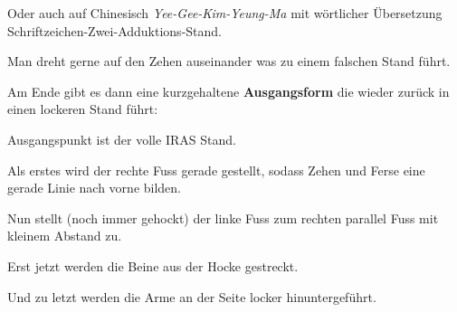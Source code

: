 	
	\begin{WTCommonBegriff}
		Oder auch auf Chinesisch \textit{Yee-Gee-Kim-Yeung-Ma} mit w\"ortlicher \"Ubersetzung Schriftzeichen-Zwei-Adduktions-Stand.
	\end{WTCommonBegriff}
	
\begin{WTCommonNoob}
	Man dreht gerne auf den Zehen auseinander was zu einem falschen Stand f\"uhrt.
\end{WTCommonNoob}




Am Ende gibt es dann eine kurzgehaltene \textbf{Ausgangsform} die wieder zur\"uck in einen lockeren Stand f\"uhrt:

\begin{WTalphenum}
	\item Ausgangspunkt ist der volle IRAS Stand.
	\item Als erstes wird der rechte Fuss gerade gestellt, sodass Zehen und Ferse eine gerade Linie nach vorne bilden.
	\item Nun stellt (noch immer gehockt) der linke Fuss zum rechten parallel Fuss mit kleinem Abstand zu.
	\item Erst jetzt werden die Beine aus der Hocke gestreckt.
	\item Und zu letzt werden die Arme an der Seite locker hinuntergef\"uhrt.
\end{WTalphenum}







